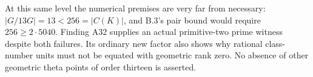 At this same level the numerical premises are very far from
necessary: $|G/13G|=13<256=|C(K)|$, and B.3's pair bound would
require $256\ge2\cdot5040$.  Finding A32 supplies an actual
primitive-two prime witness despite both failures.  Its ordinary
new factor also shows why rational class-number units must not
be equated with geometric rank zero.  No absence of other
geometric theta points of order thirteen is asserted.
